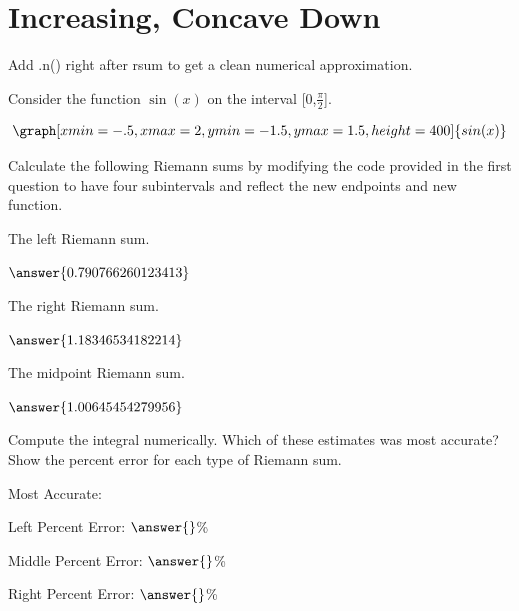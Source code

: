 \documentclass{ximera}
\begin{document}
\section{Increasing, Concave Down}
\begin{question}
\begin{hint}
Add .n() right after rsum to get a clean numerical approximation.
\end{hint}
Consider the function $\sin(x)$ on the interval [0,$\frac{\pi}{2}$].

\[
\graph[xmin=-.5,xmax=2,ymin=-1.5,ymax=1.5,height=400]{sin(x)}
\]

Calculate the following Riemann sums by modifying the code provided in the first question to have four subintervals and reflect the new endpoints and new function.

The left Riemann sum.

\begin{onlineOnly}
\begin{sageCell}

\end{sageCell}
\end{onlineOnly}

$\answer{0.790766260123413}$

The right Riemann sum.

\begin{onlineOnly}
\begin{sageCell}

\end{sageCell}
\end{onlineOnly}

$\answer{1.18346534182214}$

The midpoint Riemann sum.

\begin{onlineOnly}
\begin{sageCell}

\end{sageCell}
\end{onlineOnly}

$\answer{1.00645454279956}$

Compute the integral numerically. Which of these estimates was most accurate? Show the percent error for each type of Riemann sum.

\begin{onlineOnly}
\begin{sageCell}

\end{sageCell}
\end{onlineOnly}

Most Accurate:
\begin{multipleChoice}
\end{multipleChoice}

Left Percent Error: $\answer{}$\%

Middle Percent Error: $\answer{}$\%

Right Percent Error: $\answer{}$\%
\end{question}
\end{document}
